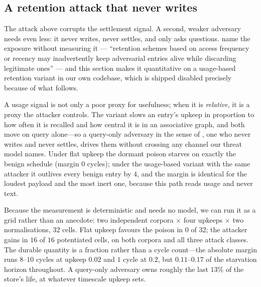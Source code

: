 \subsection{A retention attack that never writes}
\label{sec:potentiation}
The attack above corrupts the settlement signal. A second, weaker
adversary needs even less: it never writes, never settles, and only
asks questions. \citet{lin2026memsurvey} name the exposure without
measuring it --- ``retention schemes based on access frequency or
recency may inadvertently keep adversarial entries alive while
discarding legitimate ones'' --- and this section makes it
quantitative on a usage-based retention variant in our own codebase,
which is shipped disabled precisely because of what follows.

A usage signal is not only a poor proxy for usefulness; when it is
\emph{relative}, it is a proxy the attacker controls. The variant slows an
entry's upkeep in proportion to how often it is recalled and how central
it is in an associative graph, and both move on query alone---so a
query-only adversary in the sense of \citet{dong2025minja}, one who
never writes and never settles, drives them without crossing any channel
our threat model names. Under flat upkeep the dormant poison starves on
exactly the benign schedule (margin $0$ cycles); under the usage-based
variant with the same attacker it outlives every benign entry by $4$,
and the margin is identical for the loudest payload and the most inert
one, because this path reads usage and never text.

Because the measurement is deterministic and needs no model, we can run
it as a grid rather than an anecdote: two independent corpora $\times$
four upkeeps $\times$ two normalisations, $32$ cells. Flat upkeep
favours the poison in $0$ of $32$; the attacker gains in $16$ of $16$
potentiated cells, on both corpora and all three attack classes. The
durable quantity is a fraction rather than a cycle count---the absolute
margin runs $8$--$10$ cycles at upkeep $0.02$ and $1$ cycle at $0.2$,
but $0.11$--$0.17$ of the starvation horizon throughout. A query-only
adversary owns roughly the last $13\%$ of the store's life, at whatever
timescale upkeep sets.

